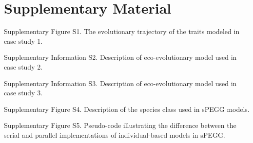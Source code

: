 \documentclass[1p,numbered]{article}
\begin{document}
	

\newpage 

\section*{Supplementary Material}
Supplementary Figure S1. The evolutionary trajectory of the traits modeled in case study 1.

\noindent Supplementary Information S2. Description of eco-evolutionary model used in case study 2.

\noindent Supplementary Information S3. Description of eco-evolutionary model used in case study 3.

\noindent Supplementary Figure S4. Description of the species class used in sPEGG models.

\noindent Supplementary Figure S5. Pseudo-code illustrating the difference between the serial  and parallel implementations of individual-based models in sPEGG. 
\end{document}
